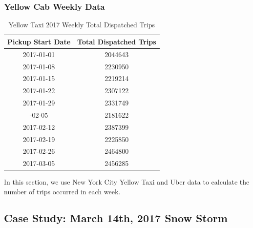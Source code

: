 \documentclass[12pt,twoside]{reedthesis}
\theoremstyle{definition}
\theoremstyle{definition}
\theoremstyle{definition}
\theoremstyle{remark}
\begin{document}
\subsubsection{Yellow Cab Weekly Data}\label{yellow-cab-weekly-data}
\begin{table}

\caption{\label{tab:unnamed-chunk-68}Yellow Taxi 2017 Weekly Total Dispatched Trips}
\centering
\begin{tabular}[t]{cc}
\toprule
Pickup Start Date & Total Dispatched Trips\\
\midrule
2017-01-01 & 2044643\\
2017-01-08 & 2230950\\
2017-01-15 & 2219214\\
2017-01-22 & 2307122\\
2017-01-29 & 2331749\\
\addlinespace
2017-02-05 & 2181622\\
2017-02-12 & 2387399\\
2017-02-19 & 2225850\\
2017-02-26 & 2464800\\
2017-03-05 & 2456285\\
\bottomrule
\end{tabular}
\end{table}
In this section, we use New York City Yellow Taxi and Uber data to
calculate the number of trips occurred in each week.

\subsection{Case Study: March 14th, 2017 Snow
Storm}\label{case-study-march-14th-2017-snow-storm}
\end{document}

